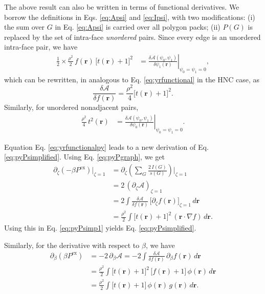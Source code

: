 \documentclass[preprint]{revtex4-1}
\newcommand{\vct}[1]{\mathbf{#1}}
\providecommand{\vr}{} %
\renewcommand{\vr}{\vct{r}}
\newcommand{\supex}[1]{ { { #1 }^{ \mathrm{ex} } } }
\newcommand{\Pex}{\supex{P}}
\newcommand{\A}{\mathcal{A}}
\begin{document}
The above result can also be written
in terms of functional derivatives.
%
We borrow the definitions in
Eqs. \eqref{eq:Apsi} and \eqref{eq:Ipsi},
with two modifications:
(i) the sum over $G$ in Eq. \eqref{eq:Apsi}
is carried over all polygon packs;
(ii) $P(G)$ is replaced by the set of intra-face \emph{unordered} pairs.
%
Since every edge is an unordered intra-face pair,
we have
%
\begin{align*}
\frac 1 2 \times \frac{\rho^2}{2} \, f(\vr) \, \bigl[ t(\vr) + 1 \bigr]^2
&=
\left.
\frac{ \delta \A(\psi_0, \psi_1) } { \delta \psi_1(\vr) }
\right|_{\psi_0 = \psi_1 = 0},
\end{align*}
which can be rewritten,
in analogous to Eq. \eqref{eq:yrfunctional} in the HNC case,
as
\begin{equation}
  \frac{ \delta \A } { \delta f(\vr)}
=
  \frac{ \rho^2 } {4}
  \bigl[ t(\vr) + 1 \bigr]^2.
  \label{eq:yrfunctionalpy}
\end{equation}
%
Similarly, for unordered nonadjacent pairs,
\begin{align*}
\frac{\rho^2}{4} \, t^2(\vr)
&=
\left.
\frac{ \delta \A(\psi_0, \psi_1) } { \delta \psi_0(\vr) }
\right|_{\psi_0 = \psi_1 = 0}.
\end{align*}
%


Equation Eq. \eqref{eq:yrfunctionalpy} leads to
a new derivation of Eq. \eqref{eq:pyPsimplified}.
%
Using Eq. \eqref{eq:pyPgraph}, we get
%
\begin{align*}
  \partial_\zeta (-\beta \Pex) \big|_{\zeta = 1}
&=
  \partial_\zeta \left( \sum_G \frac { 2 \, I(G) } { s(G) } \right) \Bigg|_{\zeta = 1}
\\
&=
  2 \, (\partial_\zeta \A)_{\zeta = 1}
\\
&=
  2 \int \frac{ \delta \A } { \delta f(\vr) } \,
  \big[ \partial_\zeta f(\vr) \big]_{\zeta = 1} \, d\vr
\\
&=
  \frac{\rho^2}{2}
  \int \bigl[ t(\vr) + 1 \bigr]^2 \,
  (\vr \cdot \nabla f) \, d\vr.
\end{align*}
%
Using this in Eq. \eqref{eq:pyPsimp1} yields Eq. \eqref{eq:pyPsimplified}.

Similarly,
for the derivative with respect to $\beta$, we have
\begin{align*}
  \partial_\beta (\beta \Pex)
&=
  -2 \, \partial_\beta \A
=
  -2 \int \frac{ \delta \A } { \delta f(\vr) } \,
  \partial_\beta f(\vr) \, d\vr
\\
&=
  \frac{\rho^2}{2}
  \int \bigl[ t(\vr) + 1 \bigr]^2 \,
  \big[ f(\vr) + 1 \bigr] \,
  \phi(\vr) \, d\vr
\\
&=
  \frac{\rho^2}{2}
  \int
  \bigl[ t(\vr) + 1 \bigr] \,
  \phi(\vr) \,
  g(\vr) \,
  d\vr.
\end{align*}
%
\end{document}
